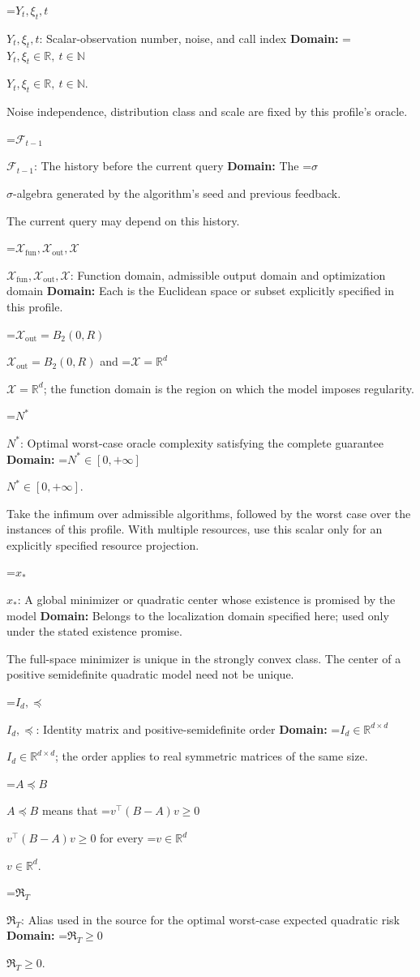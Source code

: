\documentclass[10pt,a4paper]{article}
\newcommand{\AtlasMath}[1]{\par\begingroup\centering\setbox0=\hbox{$\displaystyle #1$}\ifdim\wd0>1.4\linewidth\typeout{ATLAS WIDE FORMULA: \the\wd0}\fi\ifdim\wd0>\linewidth\resizebox{\linewidth}{!}{\box0}\else\box0\fi\par\endgroup}
\newcommand{\AtlasInlineMath}[1]{\begingroup\setbox0=\hbox{$#1$}\ifdim\wd0>.4\linewidth\endgroup\AtlasMath{#1}\else\endgroup$#1$\fi}
\begin{document}
\AtlasInlineMath{Y_t,\xi_t,t}: Scalar-observation number, noise, and call index \textbf{Domain:} \AtlasInlineMath{Y_t,\xi_t\in\mathbb{R},\ t\in\mathbb{N}}.

Noise independence, distribution class and scale are fixed by this profile's oracle.

\AtlasInlineMath{\mathcal{F}_{t-1}}: The history before the current query \textbf{Domain:} The \AtlasInlineMath{\sigma}-algebra generated by the algorithm's seed and previous feedback.

The current query may depend on this history.

\AtlasInlineMath{\mathcal{X}_{\mathrm{fun}},\mathcal{X}_{\mathrm{out}},\mathcal{X}}: Function domain, admissible output domain and optimization domain \textbf{Domain:} Each is the Euclidean space or subset explicitly specified in this profile.

\AtlasInlineMath{\mathcal{X}_{\mathrm{out}}=B_2(0,R)} and \AtlasInlineMath{\mathcal{X}=\mathbb{R}^d}; the function domain is the region on which the model imposes regularity.

\AtlasInlineMath{N^*}: Optimal worst-case oracle complexity satisfying the complete guarantee \textbf{Domain:} \AtlasInlineMath{N^*\in[0,+\infty]}.

Take the infimum over admissible algorithms, followed by the worst case over the instances of this profile. With multiple resources, use this scalar only for an explicitly specified resource projection.

\AtlasInlineMath{x_*}: A global minimizer or quadratic center whose existence is promised by the model \textbf{Domain:} Belongs to the localization domain specified here; used only under the stated existence promise.

The full-space minimizer is unique in the strongly convex class. The center of a positive semidefinite quadratic model need not be unique.

\AtlasInlineMath{I_d,\preceq}: Identity matrix and positive-semidefinite order \textbf{Domain:} \AtlasInlineMath{I_d\in\mathbb{R}^{d\times d}}; the order applies to real symmetric matrices of the same size.

\AtlasInlineMath{A\preceq B} means that \AtlasInlineMath{v^\top(B-A)v\ge0} for every \AtlasInlineMath{v\in\mathbb{R}^d}.

\AtlasInlineMath{\mathfrak R_T}: Alias used in the source for the optimal worst-case expected quadratic risk \textbf{Domain:} \AtlasInlineMath{\mathfrak R_T\ge0}.
\end{document}
